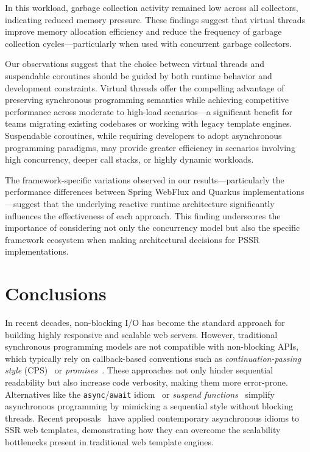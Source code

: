 \documentclass[software,article,accept,pdftex,moreauthors]{Definitions/mdpi}
\begin{document}
In this workload, garbage collection activity remained low across all
collectors, indicating reduced memory pressure. These findings suggest that
virtual threads improve memory allocation efficiency and reduce the frequency
of garbage collection cycles---particularly when used with concurrent garbage
collectors.

Our observations suggest that the choice between virtual threads and
suspendable coroutines should be guided by both runtime behavior and
development constraints. Virtual threads offer the compelling advantage of
preserving synchronous programming semantics while achieving competitive
performance across moderate to high-load scenarios---a significant benefit for
teams migrating existing codebases or working with legacy template engines.
Suspendable coroutines, while requiring developers to adopt asynchronous
programming paradigms, may provide greater efficiency in scenarios involving
high concurrency, deeper call stacks, or highly dynamic workloads.

The framework-specific variations observed in our results---particularly the
performance differences between Spring WebFlux and Quarkus
implementations---suggest that the underlying reactive runtime architecture
significantly influences the effectiveness of each approach. This finding
underscores the importance of considering not only the concurrency model but
also the specific framework ecosystem when making architectural decisions for
PSSR implementations.

\section{Conclusions}\label{s7}

In recent decades, non-blocking I/O has become the standard approach for building
highly responsive and scalable web servers. However, traditional synchronous
programming models are not compatible with non-blocking APIs, which typically
rely on callback-based conventions such as
\textit{continuation-passing style} (CPS)~\cite{scheme} or
\textit{promises}~\cite{promise}. These approaches not only hinder
sequential readability but also increase code verbosity, making them more
error-prone.
Alternatives like the \texttt{async}/\texttt{await} idiom~\cite{async_await}
or \textit{suspend functions}~\cite{elizarov2021coroutines} simplify
asynchronous programming by mimicking a sequential style without blocking
threads.
Recent proposals~\cite{carvalho2023async,wise2024pssr} have applied contemporary
asynchronous idioms to SSR web templates, demonstrating how they can overcome
the scalability bottlenecks present in traditional web template engines.
\end{document}
